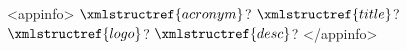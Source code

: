 <appinfo>
  $\xmlstructref{acronym}$?
  $\xmlstructref{title}$?
  $\xmlstructref{logo}$?
  $\xmlstructref{desc}$?
</appinfo>
